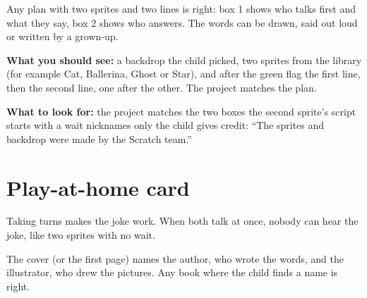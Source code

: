 \begin{answer}
Any plan with two sprites and two lines is right: box 1 shows who talks first and what they say, box 2 shows who answers. The words can be drawn, said out loud or written by a grown-up.

\textbf{What you should see:} a backdrop the child picked, two sprites from the library (for example Cat, Ballerina, Ghost or Star), and after the green flag the first line, then the second line, one after the other. The project matches the plan.

\textbf{What to look for:} \tickbox{} the project matches the two boxes \quad \tickbox{} the second sprite's script starts with a wait \quad \tickbox{} nicknames only \quad \tickbox{} the child gives credit: \enquote{The sprites and backdrop were made by the Scratch team.}
\end{answer}

\section{Play-at-home card}
\begin{answer}
Taking turns makes the joke work. When both talk at once, nobody can hear the joke, like two sprites with no wait.
\end{answer}

\begin{answer}
The cover (or the first page) names the author, who wrote the words, and the illustrator, who drew the pictures. Any book where the child finds a name is right.
\end{answer}

